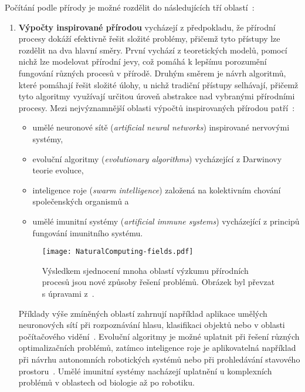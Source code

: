 Počítání podle přírody je možné rozdělit do následujících tří oblastí~\cite{FundamentalNatural}:
\begin{enumerate}
    \item \textbf{Výpočty inspirované přírodou}
        vycházejí z předpokladu, že přírodní procesy dokáží efektivně řešit složité problémy, přičemž tyto přístupy lze rozdělit na dva hlavní směry. 
        První vychází z teoretických modelů, pomocí nichž lze modelovat přírodní jevy, což pomáhá k lepšímu porozumění fungování různých procesů v přírodě. 
        Druhým směrem je návrh algoritmů, které pomáhají řešit složité úlohy, u nichž tradiční přístupy selhávají, přičemž tyto algoritmy využívají určitou úroveň abstrakce nad vybranými přírodními procesy.
        Mezi nejvýznamnější oblasti výpočtů inspirovaných přírodou patří~\cite{FundamentalNatural,NaturalComputing}:
        \begin{itemize}
            \item umělé neuronové sítě (\emph{artificial neural networks}) inspirované nervovými systémy,
            \item evoluční algoritmy (\emph{evolutionary algorithms}) vycházející z Darwinovy teorie evoluce,
            \item inteligence roje (\emph{swarm intelligence}) založená na kolektivním chování společenských organismů a
            \item umělé imunitní systémy (\emph{artificial immune systems}) vycházející z principů fungování imunitního systému.
        \end{itemize}
        \begin{figure}[ht!]
            \centering
            \texttt{[image: NaturalComputing-fields.pdf]}
            \caption{Výsledkem sjednocení mnoha oblastí výzkumu přírodních procesů jsou nové způsoby řešení problémů. Obrázek byl převzat s úpravami z~\cite{FundamentalNatural}.}
            \label{fig:natural-computing-fields}
        \end{figure}
        Příklady výše zmíněných oblastí zahrnují například aplikace umělých neuronových sítí při rozpoznávání hlasu, klasifikaci objektů nebo v oblasti počítačového vidění~\cite{ANN-review,ANN-survey}. 
        Evoluční algoritmy je možné uplatnit při řešení různých optimalizačních problémů, zatímco inteligence roje je aplikovatelná například při návrhu autonomních robotických systémů nebo při prohledávání stavového prostoru~\cite{NaturalComputing,SwarmInteligence}. 
        Umělé imunitní systémy nacházejí uplatnění u komplexních problémů v oblastech od biologie až po robotiku. 

\end{enumerate}
